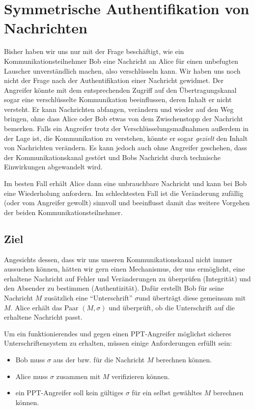 \chapter{Symmetrische Authentifikation von
  Nachrichten}\indexMessageAuthSymm
\label{cha:symauth}

Bisher haben wir uns nur mit der Frage beschäftigt, wie ein
Kommunikationsteilnehmer Bob eine Nachricht an Alice für einen
unbefugten Lauscher unverständlich machen, also verschlüsseln kann. Wir
haben uns noch nicht der Frage nach der Authentifikation einer Nachricht
gewidmet.  Der Angreifer könnte mit dem entsprechenden Zugriff auf den
Übertragungskanal sogar eine verschlüsselte Kommunikation beeinflussen,
deren Inhalt er nicht versteht. Er kann Nachrichten abfangen, verändern
und wieder auf den Weg bringen, ohne dass Alice oder Bob etwas von dem
Zwischenstopp der Nachricht bemerken.  Falls ein Angreifer trotz der
Verschlüsselungsmaßnahmen außerdem in der Lage ist, die Kommunikation zu
verstehen, könnte er sogar \textit{gezielt} den Inhalt von Nachrichten
verändern.  Es kann jedoch auch ohne Angreifer geschehen, dass der
Kommunikationskanal gestört und Bobs Nachricht durch technische
Einwirkungen abgewandelt wird.

Im besten Fall erhält Alice dann eine unbrauchbare Nachricht und kann
bei Bob eine Wiederholung anfordern. Im schlechtesten Fall ist die
Veränderung zufällig (oder vom Angreifer gewollt) sinnvoll und
beeinflusst damit das weitere Vorgehen der beiden
Kommunikationsteilnehmer.

\section{Ziel} Angesichts dessen, dass wir uns unseren
Kommunikationskanal nicht immer aussuchen können, hätten wir gern einen
Mechanismus, der uns ermöglicht, eine erhaltene Nachricht auf Fehler und
Veränderungen zu überprüfen (Integrität) und den Absender zu bestimmen
(Authentizität). Dafür erstellt Bob für seine Nachricht $M$ zusätzlich
eine "`Unterschrift"' $\sigma$\indexSig und überträgt diese gemeinsam
mit $M$. Alice erhält das Paar $(M,\sigma)$ und überprüft, ob die
Unterschrift auf die erhaltene Nachricht passt.

Um ein funktionierendes und gegen einen PPT-Angreifer möglichst sicheres
Unterschriftensystem zu erhalten, müssen einige Anforderungen erfüllt
sein:
\begin{itemize}
\item Bob muss $\sigma$ aus der bzw. für die Nachricht $M$ berechnen
  können.
\item Alice muss $\sigma$ zusammen mit $M$ verifizieren können.
\item ein PPT-Angreifer soll kein gültiges $\sigma$ für ein selbst
  gewähltes $M$ berechnen können.
\end{itemize}

